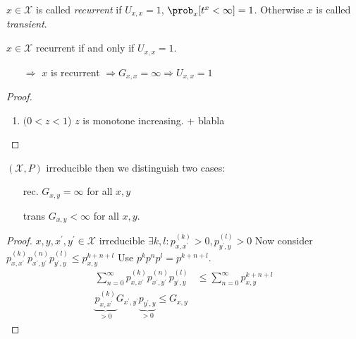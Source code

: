 \documentclass[mfit.tex]{subfiles}
\begin{document}
\begin{defi*}
  $x \in \mathcal{X}$ is called \emph{recurrent} if $U_{x,x} = 1$, $\prob_x[t^x < \infty] = 1$.
  Otherwise $x$ is called \emph{transient}.
\end{defi*}

\begin{lemma}\label{l_1}
  $x \in \mathcal{X}$ recurrent if and only if $U_{x,x} = 1$.
\end{lemma}

\begin{rem}
  \begin{enumerate}
    \item[$\Rightarrow$] $x$ is recurrent $\Rightarrow G_{x,x} = \infty \Rightarrow U_{x,x} = 1$
  \end{enumerate}
\end{rem}

\begin{proof}
  \begin{enumerate}[label=(\alph*)]
    \item $(0 < z < 1$) $z$ is monotone increasing. + blabla
  \end{enumerate}
\end{proof}

\begin{lemma}
  $(\mathcal{X},P)$ irreducible then we distinguish two cases:
  \begin{enumerate}
    \item[rec.] $G_{x,y} = \infty$ for all $x,y$
    \item[trans] $G_{x,y} < \infty$ for all $x,y$.
  \end{enumerate}
\end{lemma}

\begin{proof}
  $x,y,x^\prime,y^\prime \in \mathcal{X}$ irreducible $\exists k,l: p_{x,x^\prime}^{(k)} > 0, p_{y^\prime,y}^{(l)} >0$
  Now consider
  $p_{x,x^\prime}^{(k)} p_{x^\prime,y^\prime}^{(n)} p_{y^\prime,y}^{(l)} \leq p_{x,y}^{k+n+l}$
  Use $p^k p^n p^l = p^{k+n+l}$.
  \begin{align*}
    \sum_{n=0}^\infty p_{x,x^\prime}^{(k)} p_{x^\prime,y^\prime}^{(n)} p_{y^\prime,y}^{(l)} &\leq \sum_{n=0}^\infty p_{x,y}^{k+n+l} \\
    \underbrace{p_{x,x^\prime}^{(k)}}_{>0} G_{x^\prime,y^\prime} \underbrace{p_{y^\prime,y}}_{> 0} \leq G_{x,y}
  \end{align*}
\end{proof}
\end{document}
